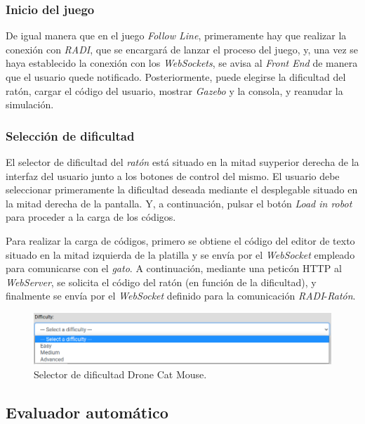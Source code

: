 \documentclass[a4paper, 12pt]{book}
\begin{document}
\subsubsection{Inicio del juego}
\label{drone_cat_mouse_inicio}

De igual manera que en el juego \emph{Follow Line}, primeramente hay que realizar la conexión con \emph{RADI}, que se encargará de lanzar el proceso del juego, y, una vez se haya establecido la conexión con los \emph{WebSockets}, se avisa al \emph{Front End} de manera que el usuario quede notificado. Posteriormente, puede elegirse la dificultad del ratón, cargar el código del usuario, mostrar \emph{Gazebo} y la consola,  y reanudar la simulación.

\subsubsection{Selección de dificultad}
\label{drone_cat_mouse_difficulty}

El selector de dificultad del \emph{ratón} está situado en la mitad suyperior derecha de la interfaz del usuario junto a los botones de control del mismo. El usuario debe seleccionar primeramente la dificultad deseada mediante el desplegable situado en la mitad derecha de la pantalla. Y, a continuación, pulsar el botón \emph{Load in robot} para proceder a la carga de los códigos.

Para realizar la carga de códigos, primero se obtiene el código del editor de texto situado en la mitad izquierda de la platilla y se envía por el \emph{WebSocket} empleado para comunicarse con el \emph{gato}. A continuación, mediante una peticón HTTP al \emph{WebServer}, se solicita el código del ratón (en función de la dificultad), y finalmente se envía por el \emph{WebSocket} definido para la comunicación  \emph{RADI}-\emph{Ratón}.

\begin{figure}[H]
	\centering
    \includegraphics[width=15cm]{img/drone_cat_mouse_difficulty.png}
    \caption{Selector de dificultad Drone Cat Mouse.}
    \label{figura:evaluator_drone}
\end{figure}

\subsection{Evaluador automático}
\label{drone_cat_mouse_evaluator}
\end{document}
